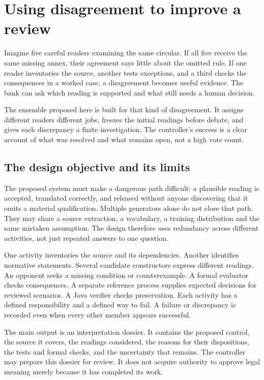 \chapter{Using disagreement to improve a review}
\label{ch:ensemble}

Imagine five careful readers examining the same circular. If all five receive
the same missing annex, their agreement says little about the omitted rule. If
one reader inventories the source, another tests exceptions, and a third checks
the consequences in a worked case, a disagreement becomes useful evidence. The
bank can ask which reading is supported and what still needs a human decision.

The ensemble proposed here is built for that kind of disagreement. It assigns
different readers different jobs, freezes the initial readings before debate,
and gives each discrepancy a finite investigation. The controller's success is
a clear account of what was resolved and what remains open, not a high vote
count.


\section{The design objective and its limits}
\label{merge:M06:00}


The proposed system must make a dangerous path difficult: a plausible reading is
accepted, translated correctly, and released without anyone discovering that it
omits a material qualification. Multiple generators alone do not close that path.
They may share a source extraction, a vocabulary, a training distribution and the
same mistaken assumption. The design therefore uses redundancy across different
activities, not just repeated answers to one question.

One activity inventories the source and its dependencies. Another identifies
normative statements. Several candidate constructors express different readings.
An opponent seeks a missing condition or counterexample. A formal evaluator
checks consequences. A separate reference process supplies expected decisions
for reviewed scenarios. A Java verifier checks preservation. Each activity has a
defined responsibility and a defined way to fail. A failure or discrepancy is
recorded even when every other member appears successful.

The main output is an interpretation dossier. It contains the proposed control,
the source it covers, the readings considered, the reasons for their dispositions,
the tests and formal checks, and the uncertainty that remains. The controller
may prepare this dossier for review. It does not acquire authority to approve
legal meaning merely because it has completed its work.

